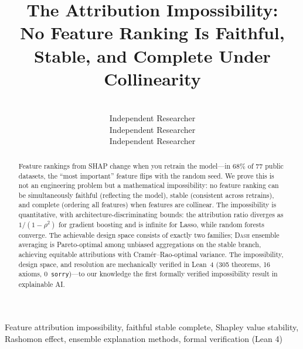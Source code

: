 \documentclass{jmlr}
\title[The Attribution Impossibility]{The Attribution Impossibility:\\{\large No Feature Ranking Is Faithful, Stable, and Complete Under Collinearity}}
\author{\Name{Drake Caraker} \Email{drakecaraker@gmail.com}\\
  \addr Independent Researcher
  \AND
  \Name{Bryan Arnold} \Email{puremath86@gmail.com}\\
  \addr Independent Researcher
  \AND
  \Name{David Rhoads} \Email{drhoads9@gmail.com}\\
  \addr Independent Researcher
}
\newcommand{\DASH}{\textsc{Dash}}
\begin{document}
\maketitle


\begin{abstract}
Feature rankings from SHAP change when you retrain the model---in 68\% of 77 public datasets, the ``most important'' feature flips with the random seed. We prove this is not an engineering problem but a mathematical impossibility: no feature ranking can be simultaneously faithful (reflecting the model), stable (consistent across retrains), and complete (ordering all features) when features are collinear. The impossibility is quantitative, with architecture-discriminating bounds: the attribution ratio diverges as $1/(1{-}\rho^2)$ for gradient boosting and is infinite for Lasso, while random forests converge. The achievable design space consists of exactly two families; \DASH{} ensemble averaging is Pareto-optimal among unbiased aggregations on the stable branch, achieving equitable attributions with Cram\'er--Rao-optimal variance. The impossibility, design space, and resolution are mechanically verified in Lean~4 (305 theorems, 16 axioms, 0~\texttt{sorry})---to our knowledge the first formally verified impossibility result in explainable AI.
\end{abstract}

\begin{keywords}
Feature attribution impossibility, faithful stable complete, Shapley value stability, Rashomon effect, ensemble explanation methods, formal verification (Lean 4)
\end{keywords}
\end{document}
